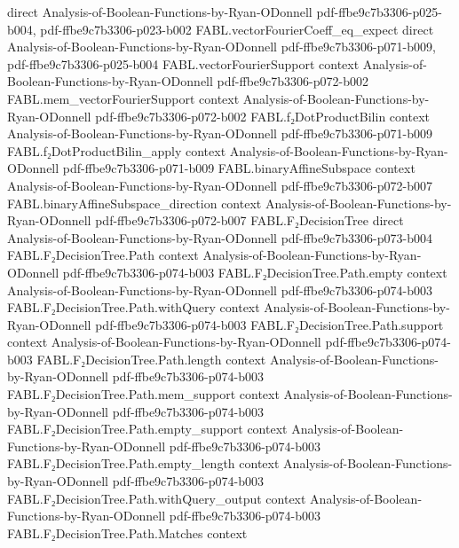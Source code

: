 \begin{theorem}
  {direct}
  {Analysis-of-Boolean-Functions-by-Ryan-ODonnell}
  {pdf-ffbe9c7b3306-p025-b004,
    pdf-ffbe9c7b3306-p023-b002}
\proofstep
  {FABL.vectorFourierCoeff_eq_expect}
  {direct}
  {Analysis-of-Boolean-Functions-by-Ryan-ODonnell}
  {pdf-ffbe9c7b3306-p071-b009,
    pdf-ffbe9c7b3306-p025-b004}
\proofstep
  {FABL.vectorFourierSupport}
  {context}
  {Analysis-of-Boolean-Functions-by-Ryan-ODonnell}
  {pdf-ffbe9c7b3306-p072-b002}
\proofstep
  {FABL.mem_vectorFourierSupport}
  {context}
  {Analysis-of-Boolean-Functions-by-Ryan-ODonnell}
  {pdf-ffbe9c7b3306-p072-b002}
\proofstep
  {FABL.f₂DotProductBilin}
  {context}
  {Analysis-of-Boolean-Functions-by-Ryan-ODonnell}
  {pdf-ffbe9c7b3306-p071-b009}
\proofstep
  {FABL.f₂DotProductBilin_apply}
  {context}
  {Analysis-of-Boolean-Functions-by-Ryan-ODonnell}
  {pdf-ffbe9c7b3306-p071-b009}
\proofstep
  {FABL.binaryAffineSubspace}
  {context}
  {Analysis-of-Boolean-Functions-by-Ryan-ODonnell}
  {pdf-ffbe9c7b3306-p072-b007}
\proofstep
  {FABL.binaryAffineSubspace_direction}
  {context}
  {Analysis-of-Boolean-Functions-by-Ryan-ODonnell}
  {pdf-ffbe9c7b3306-p072-b007}
\proofstep
  {FABL.F₂DecisionTree}
  {direct}
  {Analysis-of-Boolean-Functions-by-Ryan-ODonnell}
  {pdf-ffbe9c7b3306-p073-b004}
\proofstep
  {FABL.F₂DecisionTree.Path}
  {context}
  {Analysis-of-Boolean-Functions-by-Ryan-ODonnell}
  {pdf-ffbe9c7b3306-p074-b003}
\proofstep
  {FABL.F₂DecisionTree.Path.empty}
  {context}
  {Analysis-of-Boolean-Functions-by-Ryan-ODonnell}
  {pdf-ffbe9c7b3306-p074-b003}
\proofstep
  {FABL.F₂DecisionTree.Path.withQuery}
  {context}
  {Analysis-of-Boolean-Functions-by-Ryan-ODonnell}
  {pdf-ffbe9c7b3306-p074-b003}
\proofstep
  {FABL.F₂DecisionTree.Path.support}
  {context}
  {Analysis-of-Boolean-Functions-by-Ryan-ODonnell}
  {pdf-ffbe9c7b3306-p074-b003}
\proofstep
  {FABL.F₂DecisionTree.Path.length}
  {context}
  {Analysis-of-Boolean-Functions-by-Ryan-ODonnell}
  {pdf-ffbe9c7b3306-p074-b003}
\proofstep
  {FABL.F₂DecisionTree.Path.mem_support}
  {context}
  {Analysis-of-Boolean-Functions-by-Ryan-ODonnell}
  {pdf-ffbe9c7b3306-p074-b003}
\proofstep
  {FABL.F₂DecisionTree.Path.empty_support}
  {context}
  {Analysis-of-Boolean-Functions-by-Ryan-ODonnell}
  {pdf-ffbe9c7b3306-p074-b003}
\proofstep
  {FABL.F₂DecisionTree.Path.empty_length}
  {context}
  {Analysis-of-Boolean-Functions-by-Ryan-ODonnell}
  {pdf-ffbe9c7b3306-p074-b003}
\proofstep
  {FABL.F₂DecisionTree.Path.withQuery_output}
  {context}
  {Analysis-of-Boolean-Functions-by-Ryan-ODonnell}
  {pdf-ffbe9c7b3306-p074-b003}
\proofstep
  {FABL.F₂DecisionTree.Path.Matches}
  {context}

\end{theorem}
